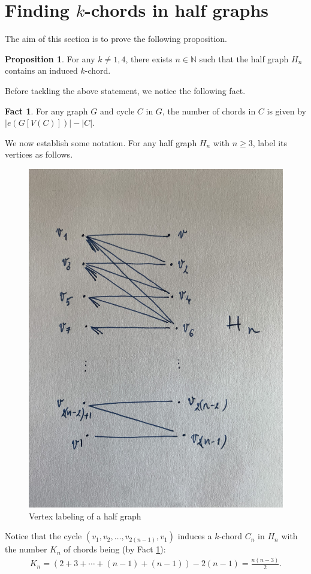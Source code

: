 \documentclass[12pt]{article}
\theoremstyle{definition}
\newtheorem{prop}[thm]{Proposition}
\newtheorem{fact}[thm]{Fact}
\begin{document}
    \section{Finding \texorpdfstring{$k$}{k}-chords in half graphs}
    
    The aim of this section 
    is to prove the following 
    proposition.

    \begin{prop} \label{prop:hg}
        For any $k \neq 1, 4$,
        there exists $n \in \mathbb{N}$
        such that the half
        graph $H_{n}$ 
        contains an induced 
        $k$-chord.
    \end{prop}

    Before tackling the
    above statement, we notice the
    following fact.
    
    \begin{fact} \label{fact:edges}
        For any graph $G$
        and cycle $C$ in $G$, 
        the number of chords in $C$ 
        is given by $\left|e\left(G\left[V\left(C\right)\right]\right)\right|
        - \left|C\right|$.
    \end{fact}
    
    We now establish 
    some notation. For
    any half graph $H_{n}$ 
    with $n \geq 3$, label
    its vertices as follows.
    \begin{figure}[h]
        \centering
        \includegraphics[width=0.35\linewidth, angle=270]{Figure_k-chord.jpg}
        \caption{Vertex labeling of a half graph}
        \label{fig:hg}
    \end{figure}

    Notice that the cycle
    $\left(v_1, v_2, \ldots,
    v_{2\left(n-1\right)}, v_1\right)$ 
    induces a $k$-chord
    $C_{n}$ in $H_{n}$
    with the number $K_{n}$ 
    of chords being (by Fact \ref{fact:edges}):
    \begin{gather*}
        K_{n} = \left(
        2 + 3 + \cdots + \left(n-1\right)
        + \left(n-1\right)\right)
        -2\left(n-1\right) =
        \frac{n\left(n-3\right)}{2}.
    \end{gather*}
    
\end{document}
